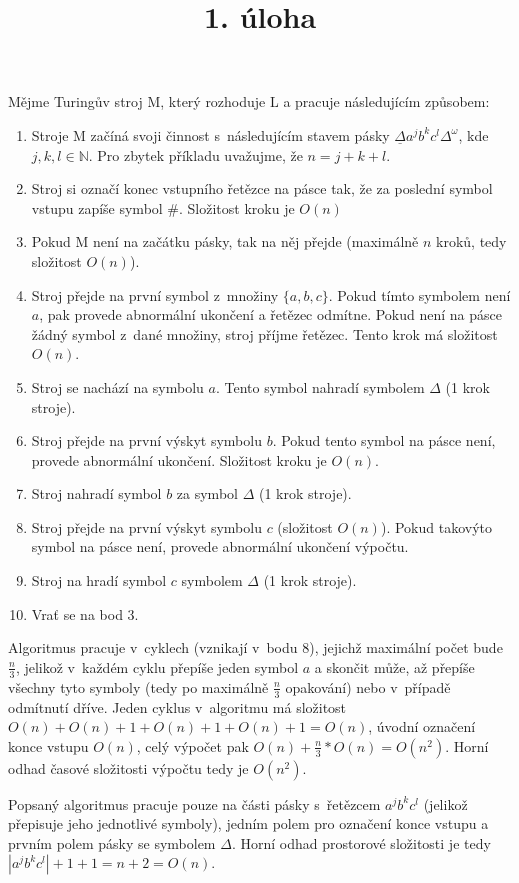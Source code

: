 \documentclass[a4paper]{article}
\title {1. úloha}
\begin{document}
\section*{}
Mějme Turingův stroj M, který rozhoduje L a pracuje následujícím způsobem:
\begin{enumerate}
    \item Stroje M začíná svoji činnost s~následujícím stavem pásky $\underline{\Delta}a^j b^k c^l\Delta^{\omega}$, kde $j,k,l \in \mathbb{N}$.
    Pro zbytek příkladu uvažujme, že $n=j+k+l$.
    \item Stroj si označí konec vstupního řetězce na pásce tak, že za poslední symbol vstupu zapíše symbol $\#$.
    Složitost kroku je $O(n)$
    \item Pokud M není na začátku pásky, tak na něj přejde (maximálně $n$ kroků, tedy složitost $O(n)$).
    \item Stroj přejde na první symbol z~množiny $\{a,b,c\}$.
    Pokud tímto symbolem není $a$, pak provede abnormální ukončení a řetězec odmítne.
    Pokud není na pásce žádný symbol z~dané množiny, stroj příjme řetězec.
    Tento krok má složitost $O(n)$.
    \item Stroj se nachází na symbolu $a$. Tento symbol nahradí symbolem $\Delta$ (1 krok stroje).
    \item Stroj přejde na první výskyt symbolu $b$.
    Pokud tento symbol na pásce není, provede abnormální ukončení.
    Složitost kroku je $O(n)$.
    \item Stroj nahradí symbol $b$ za symbol $\Delta$ (1 krok stroje).
    \item Stroj přejde na první výskyt symbolu $c$ (složitost $O(n)$).
    Pokud takovýto symbol na pásce není, provede abnormální ukončení výpočtu.
    \item Stroj na hradí symbol $c$ symbolem $\Delta$ (1 krok stroje).
    \item Vrať se na bod 3.
\end{enumerate}
Algoritmus pracuje v~cyklech (vznikají v~bodu 8),
jejichž maximální počet bude $\frac{n}{3}$, jelikož v~každém cyklu přepíše jeden symbol $a$ a skončit může, až přepíše
všechny tyto symboly (tedy po maximálně $\frac{n}{3}$ opakování) nebo v~případě odmítnutí dříve.
Jeden cyklus v~algoritmu má složitost $O(n)+O(n)+1+O(n)+1+O(n)+1=O(n)$, úvodní označení konce vstupu $O(n)$, celý výpočet pak
$O(n)+\frac{n}{3}*O(n)=O(n^2)$. Horní odhad časové složitosti výpočtu tedy je $O(n^2)$.

Popsaný algoritmus pracuje pouze na části pásky s~řetězcem $a^j b^k c^l$ (jelikož přepisuje jeho jednotlivé symboly),
jedním polem pro označení konce vstupu a prvním polem pásky se symbolem $\Delta$.
Horní odhad prostorové složitosti je tedy $|a^j b^k c^l|+1+1=n+2=O(n)$. 
\end{document}
